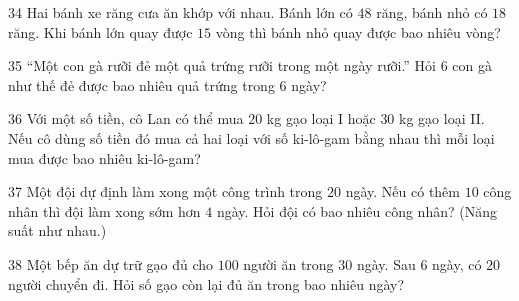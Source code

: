 \gap
\begin{probbox}{34}{}
Hai bánh xe răng cưa ăn khớp với nhau. Bánh lớn có $48$ răng, bánh nhỏ có $18$ răng. Khi bánh lớn quay được $15$ vòng thì bánh nhỏ quay được bao nhiêu vòng?
\end{probbox}
\gap
\begin{probbox}{35}{}
``Một con gà rưỡi đẻ một quả trứng rưỡi trong một ngày rưỡi.'' Hỏi $6$ con gà như thế đẻ được bao nhiêu quả trứng trong $6$ ngày?
\end{probbox}
\gap
\begin{probbox}{36}{}
Với một số tiền, cô Lan có thể mua $20$ kg gạo loại I hoặc $30$ kg gạo loại II. Nếu cô dùng số tiền đó mua cả hai loại với số ki-lô-gam bằng nhau thì mỗi loại mua được bao nhiêu ki-lô-gam?
\end{probbox}
\gap
\begin{probbox}{37}{}
Một đội dự định làm xong một công trình trong $20$ ngày. Nếu có thêm $10$ công nhân thì đội làm xong sớm hơn $4$ ngày. Hỏi đội có bao nhiêu công nhân? (Năng suất như nhau.)
\end{probbox}
\gap
\begin{probbox}{38}{}
Một bếp ăn dự trữ gạo đủ cho $100$ người ăn trong $30$ ngày. Sau $6$ ngày, có $20$ người chuyển đi. Hỏi số gạo còn lại đủ ăn trong bao nhiêu ngày?
\end{probbox}
